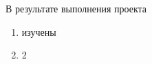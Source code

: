 \Conclusion %

В результате выполнения проекта
\begin{enumerate}
	\item изучены
	\item 2
\end{enumerate}
